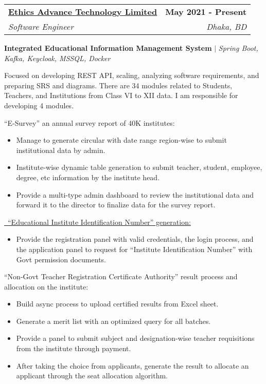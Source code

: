 \documentclass[letterpaper,11pt]{article}
\makeatletter
\newcommand{\resumeItem}[1]{
  \item\small{
    {#1 \vspace{-2pt}}
  }
}
\newcommand{\resumeSubheading}[4]{
  \vspace{-2pt}\item
    \begin{tabular*}{1.0\textwidth}[t]{l@{\extracolsep{\fill}}r}
      \textbf{#1} & \textbf{\small #2} \\
      \textit{\small#3} & \textit{\small #4} \\
    \end{tabular*}\vspace{-7pt}
}
\newcommand{\resumeItemListStart}{\begin{itemize}}
\newcommand{\resumeItemListEnd}{\end{itemize}\vspace{-5pt}}
\makeatother
\begin{document}
\resumeSubheading
      {\href{https://www.eatlbd.com/}{Ethics Advance Technology Limited}}{May 2021 - Present}
      {Software Engineer}{Dhaka, BD}
      \resumeItemListStart
        \resumeItem{\textbf {Integrated Educational Information Management System} $|$ \emph{Spring Boot, Kafka, Keycloak, MSSQL, Docker}}\\
        {Focused on developing REST API, scaling, analyzing software requirements, and preparing SRS and diagrams. There are 34 modules related to Students, Teachers, and Institutions from Class VI to XII data. I am responsible for developing 4 modules.
        \item “E-Survey” an annual survey report of 40K institutes:
        \begin{itemize}
            \item Manage to generate circular with date range region-wise to submit institutional data by admin.
            \item Institute-wise dynamic table generation to submit teacher, student, employee, degree, etc information by the institute head.
            \item Provide a multi-type admin dashboard to review the institutional data and forward it to the director to finalize data for the survey report.
        \end{itemize}
        \item \href{https://drive.google.com/file/d/1fVWXGnWhhOyQ3PxP9Sq6xS4-KbgBTuGu}{\raisebox{-0.2\height}\ \underline{“Educational Institute Identification Number” generation:}}
        \begin{itemize}
            \item Provide the registration panel with valid credentials, the login process, and the application panel to request for “Institute Identification Number” with Govt permission documents.
        \end{itemize}
        \item “Non-Govt Teacher Registration Certificate Authority” result process and allocation on the institute:
        \begin{itemize}
            \item Build async process to upload certified results from Excel sheet.
            \item Generate a merit list with an optimized query for all batches.
            \item Provide a panel to submit subject and designation-wise teacher requisitions from the institute
through payment.
            \item After taking the choice from applicants, generate the result to allocate an applicant through the seat allocation algorithm.
        \end{itemize}
}
      \resumeItemListEnd
\end{document}
